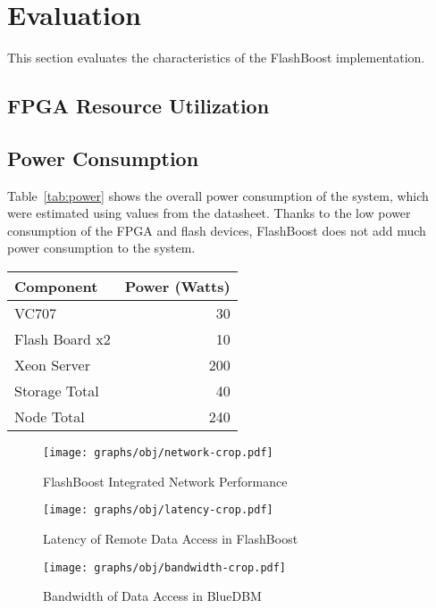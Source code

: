 \section{Evaluation}
\label{sec:results}

This section evaluates the characteristics of the FlashBoost implementation.

\subsection{FPGA Resource Utilization}

\subsection{Power Consumption}
Table~\ref{tab:power} shows the overall power consumption of the system, which
were estimated using values from the datasheet. Thanks to the low power
consumption of the FPGA and flash devices, FlashBoost does not add much power
consumption to the system.

\begin{tabular}{l | r}
\label{tab:power}
Component & Power (Watts) \\
\hline \hline
VC707 & 30 \\
Flash Board x2 & 10 \\
Xeon Server & 200 \\
\hline
Storage Total & 40 \\
Node Total & 240 \\

\end{tabular}

\begin{figure*}[ht]
\centering
\vspace{0pt}
\begin{minipage}[c]{.3\textwidth}
	\texttt{[image: graphs/obj/network-crop.pdf]}
	\caption{FlashBoost Integrated Network Performance}
	\label{fig:result_network}
\end{minipage}\hfill
\vspace{0pt}
\begin{minipage}[c]{.3\textwidth}
	\texttt{[image: graphs/obj/latency-crop.pdf]}
	\caption{Latency of Remote Data Access in FlashBoost}
	\label{fig:result_latency}
\end{minipage}\hfill
\vspace{0pt}
\begin{minipage}[c]{.3\textwidth}
	\texttt{[image: graphs/obj/bandwidth-crop.pdf]}
	\caption{Bandwidth of Data Access in BlueDBM}
	\label{fig:result_bandwidth}
\end{minipage}
\end{figure*}

